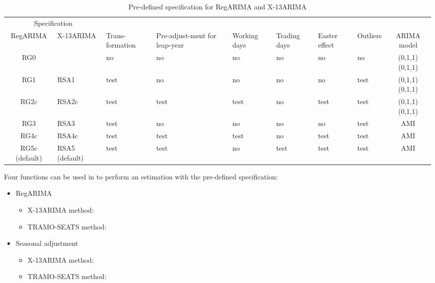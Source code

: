 \documentclass[article]{jss}
\providecommand{\tightlist}{%
  \setlength{\itemsep}{0pt}\setlength{\parskip}{0pt}}
\begin{document}
\begin{table}

\caption{\label{tab:pre_def_x13}Pre-defined specification for RegARIMA and X-13ARIMA}
\centering
\fontsize{7}{9}\selectfont
\begin{tabular}[t]{c>{\centering\arraybackslash}p{1.7cm}>{\centering\arraybackslash}p{}>{\centering\arraybackslash}p{1.4cm}>{\centering\arraybackslash}p{0.9cm}>{\centering\arraybackslash}p{0.9cm}>{\centering\arraybackslash}p{0.9cm}>{\centering\arraybackslash}p{0.9cm}c}
\toprule
\multicolumn{2}{c}{Specification} & \multicolumn{1}{c}{} \\
\cmidrule(l{2pt}r{2pt}){1-2}
RegARIMA & X-13ARIMA & Trans-formation & Pre-adjust-ment for leap-year & Working days & Trading days & Easter effect & Outliers & ARIMA model\\
\midrule
RG0 &  & no & no & no & no & no & no & (0,1,1)(0,1,1)\\
RG1 & RSA1 & test & no & no & no & no & test & (0,1,1)(0,1,1)\\
RG2c & RSA2c & test & test & test & no & test & test & (0,1,1)(0,1,1)\\
RG3 & RSA3 & test & no & no & no & no & test & AMI\\
RG4c & RSA4c & test & test & test & no & test & test & AMI\\
RG5c (default) & RSA5 (default) & test & test & no & test & test & test & AMI\\
\bottomrule
\end{tabular}
\end{table}

Four functions can be used in  to perform an estimation
with the pre-defined specification:

\begin{itemize}
\tightlist
\item
  RegARIMA

  \begin{itemize}
  \tightlist
  \item
    X-13ARIMA method: 
  \item
    TRAMO-SEATS method: 
  \end{itemize}
\item
  Seasonal adjustment

  \begin{itemize}
  \tightlist
  \item
    X-13ARIMA method: 
  \item
    TRAMO-SEATS method: 
  \end{itemize}
\end{itemize}
\end{document}
